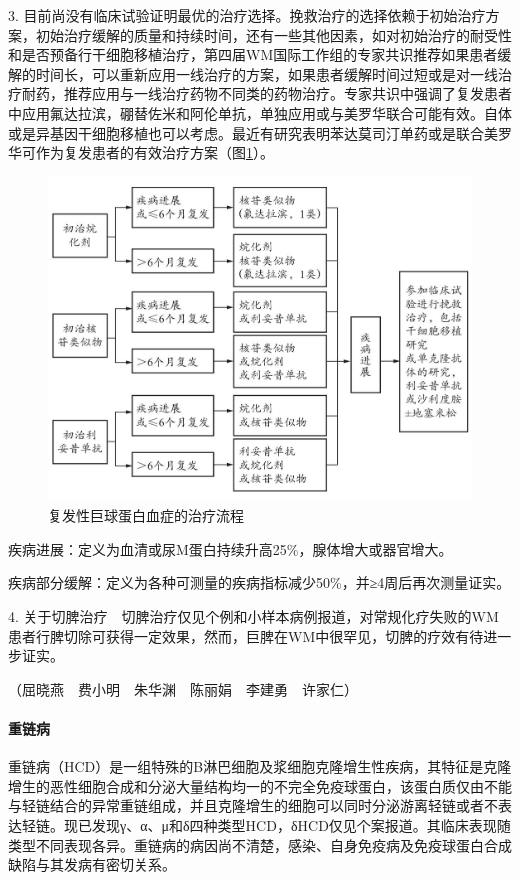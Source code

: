 3.
目前尚没有临床试验证明最优的治疗选择。挽救治疗的选择依赖于初始治疗方案，初始治疗缓解的质量和持续时间，还有一些其他因素，如对初始治疗的耐受性和是否预备行干细胞移植治疗，第四届WM国际工作组的专家共识推荐如果患者缓解的时间长，可以重新应用一线治疗的方案，如果患者缓解时间过短或是对一线治疗耐药，推荐应用与一线治疗药物不同类的药物治疗。专家共识中强调了复发患者中应用氟达拉滨，硼替佐米和阿伦单抗，单独应用或与美罗华联合可能有效。自体或是异基因干细胞移植也可以考虑。最近有研究表明苯达莫司汀单药或是联合美罗华可作为复发患者的有效治疗方案（图\ref{fig5-4-7}）。

\begin{figure}[!htbp]
 \centering
 \includegraphics{./images/Image00168.jpg}
 \captionsetup{justification=centering}
 \caption{复发性巨球蛋白血症的治疗流程}
 \label{fig5-4-7}
  \end{figure} 

疾病进展：定义为血清或尿M蛋白持续升高25\%，腺体增大或器官增大。

疾病部分缓解：定义为各种可测量的疾病指标减少50\%，并≥4周后再次测量证实。

4.
关于切脾治疗　切脾治疗仅见个例和小样本病例报道，对常规化疗失败的WM患者行脾切除可获得一定效果，然而，巨脾在WM中很罕见，切脾的疗效有待进一步证实。

（屈晓燕　费小明　朱华渊　陈丽娟　李建勇　许家仁）

\paragraph{重链病}

重链病（HCD）是一组特殊的B淋巴细胞及浆细胞克隆增生性疾病，其特征是克隆增生的恶性细胞合成和分泌大量结构均一的不完全免疫球蛋白，该蛋白质仅由不能与轻链结合的异常重链组成，并且克隆增生的细胞可以同时分泌游离轻链或者不表达轻链。现已发现γ、α、μ和δ四种类型HCD，δHCD仅见个案报道。其临床表现随类型不同表现各异。重链病的病因尚不清楚，感染、自身免疫病及免疫球蛋白合成缺陷与其发病有密切关系。

